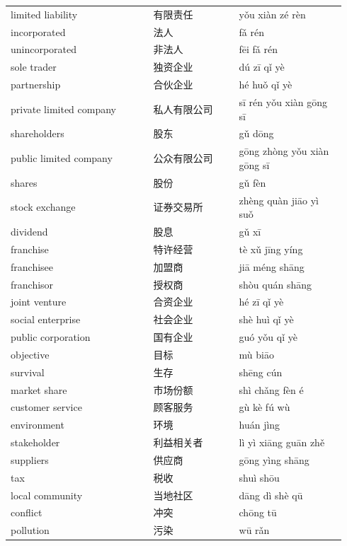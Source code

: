 \documentclass[11pt]{article}
\begin{document}
\begin{longtable}{@{}p{0.40\linewidth}p{0.24\linewidth}p{0.30\linewidth}@{}}
limited liability & 有限责任 & yǒu xiàn zé rèn \\
incorporated & 法人 & fǎ rén \\
unincorporated & 非法人 & fēi fǎ rén \\
sole trader & 独资企业 & dú zī qǐ yè \\
partnership & 合伙企业 & hé huǒ qǐ yè \\
private limited company & 私人有限公司 & sī rén yǒu xiàn gōng sī \\
shareholders & 股东 & gǔ dōng \\
public limited company & 公众有限公司 & gōng zhòng yǒu xiàn gōng sī \\
shares & 股份 & gǔ fèn \\
stock exchange & 证券交易所 & zhèng quàn jiāo yì suǒ \\
dividend & 股息 & gǔ xī \\
franchise & 特许经营 & tè xǔ jīng yíng \\
franchisee & 加盟商 & jiā méng shāng \\
franchisor & 授权商 & shòu quán shāng \\
joint venture & 合资企业 & hé zī qǐ yè \\
social enterprise & 社会企业 & shè huì qǐ yè \\
public corporation & 国有企业 & guó yǒu qǐ yè \\
objective & 目标 & mù biāo \\
survival & 生存 & shēng cún \\
market share & 市场份额 & shì chǎng fèn é \\
customer service & 顾客服务 & gù kè fú wù \\
environment & 环境 & huán jìng \\
stakeholder & 利益相关者 & lì yì xiāng guān zhě \\
suppliers & 供应商 & gōng yìng shāng \\
tax & 税收 & shuì shōu \\
local community & 当地社区 & dāng dì shè qū \\
conflict & 冲突 & chōng tū \\
pollution & 污染 & wū rǎn \\
\end{longtable}
\end{document}
